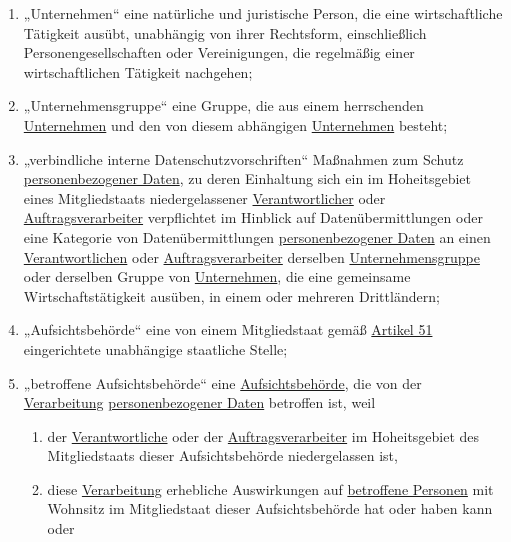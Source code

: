 \begin{enumerate}
  \item „Unternehmen“ eine natürliche und juristische Person, die eine wirtschaftliche Tätigkeit ausübt, unabhängig von
   ihrer Rechtsform, einschließlich Personengesellschaften oder Vereinigungen, die regelmäßig einer wirtschaftlichen
   Tätigkeit nachgehen;
  \label{itm:04-18}

  \item „Unternehmensgruppe“ eine Gruppe, die aus einem herrschenden \hyperref[itm:04-18]{Unternehmen} und den von
   diesem abhängigen
   \hyperref[itm:04-18]{Unternehmen} besteht;
  \label{itm:04-19}

  \item „verbindliche interne Datenschutzvorschriften“ Maßnahmen zum Schutz \hyperref[itm:04-1]
   {personenbezogener Daten}, zu deren Einhaltung sich ein im Hoheitsgebiet eines Mitgliedstaats
   niedergelassener \hyperref[itm:04-7]{Verantwortlicher} oder \hyperref[itm:04-8]{Auftragsverarbeiter} verpflichtet im
   Hinblick auf Datenübermittlungen oder eine Kategorie von Datenübermittlungen \hyperref[itm:04-1]
   {personenbezogener Daten} an einen \hyperref[itm:04-7]{Verantwortlichen} oder \hyperref[itm:04-8]
   {Auftragsverarbeiter} derselben \hyperref[itm:04-19]{Unternehmensgruppe} oder derselben Gruppe von
   \hyperref[itm:04-18]{Unternehmen}, die eine gemeinsame Wirtschaftstätigkeit ausüben, in einem oder mehreren
    Drittländern;
  \label{itm:04-20}

  \item „Aufsichtsbehörde“ eine von einem Mitgliedstaat gemäß \hyperref[ch:51]{Artikel 51} eingerichtete unabhängige
   staatliche Stelle;
  \label{itm:04-21}   

  \item „betroffene Aufsichtsbehörde“ eine \hyperref[itm:04-21]{Aufsichtsbehörde}, die von der \hyperref[itm:04-2]
   {Verarbeitung} \hyperref[itm:04-1]{personenbezogener Daten} betroffen ist, weil
  \label{itm:04-22}

  \begin{enumerate}

    \item der \hyperref[itm:04-7]{Verantwortliche} oder der \hyperref[itm:04-8]{Auftragsverarbeiter} im Hoheitsgebiet
     des Mitgliedstaats dieser Aufsichtsbehörde niedergelassen ist,
    \label{itm:04-22a}

    \item diese \hyperref[itm:04-2]{Verarbeitung} erhebliche Auswirkungen auf \hyperref[itm:04-1]{betroffene Personen}
     mit Wohnsitz im Mitgliedstaat dieser Aufsichtsbehörde hat oder haben kann oder
    \label{itm:04-22b}


\end{enumerate}
\end{enumerate}
